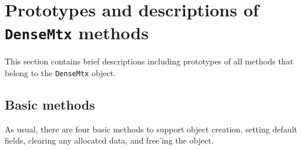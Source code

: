 \par
\section{Prototypes and descriptions of {\tt DenseMtx} methods}
\label{section:DenseMtx:proto}
\par
This section contains brief descriptions including prototypes
of all methods that belong to the {\tt DenseMtx} object.
\par
\subsection{Basic methods}
\label{subsection:DenseMtx:proto:basics}
\par
As usual, there are four basic methods to support object creation,
setting default fields, clearing any allocated data, and free'ing
the object.
\par
